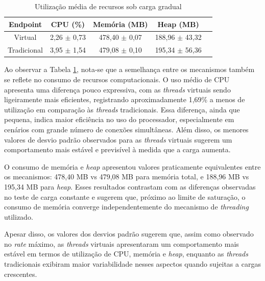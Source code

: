 \documentclass[12pt, openright, oneside, a4paper, english,	french,	spanish, brazil	]{abntex2}
\begin{document}
\begin{table}[H]
    \centering
    \caption{\footnotesize Utilização média de recursos sob carga gradual}
    \label{tab:recursos_ramp_up}
    \footnotesize
    \renewcommand{\arraystretch}{1.15}
    \setlength{\tabcolsep}{6pt}
    \begin{tabular}{ccccc}
        \toprule
        \textbf{Endpoint} &
        \textbf{CPU (\%)} &
        \textbf{Memória (MB)} &
        \textbf{Heap (MB)} \\
        \midrule
        Virtual          & 2,26 $\pm$ 0,73 & 478,40 $\pm$ 0,07 & 188,96 $\pm$ 43,32 \\
        Tradicional         & 3,95 $\pm$ 1,54 & 479,08 $\pm$ 0,10 & 195,34 $\pm$ 56,36\\
        \bottomrule
    \end{tabular}
\end{table}


Ao observar a Tabela \ref{tab:recursos_ramp_up}, nota-se que a semelhança entre os mecanismos também se reflete no consumo de recursos computacionais. O uso médio de CPU apresenta uma diferença pouco expressiva, com as \textit{threads} virtuais sendo ligeiramente mais eficientes, registrando aproximadamente 1,69\% a menos de utilização em comparação às \textit{threads} tradicionais.
Essa diferença, ainda que pequena, indica maior eficiência no uso do processador, especialmente em cenários com grande número de conexões simultâneas. Além disso, os menores valores de desvio padrão observados para as \textit{threads} virtuais sugerem um comportamento mais estável e previsível à medida que a carga aumenta.

O consumo de memória e \textit{heap} apresentou valores praticamente equivalentes entre os mecanismos: 478,40 MB vs 479,08 MB para memória total, e 188,96 MB vs 195,34 MB para \textit{heap}. Esses resultados contrastam com as diferenças observadas no teste de carga constante e sugerem que, próximo ao limite de saturação, o consumo de memória converge independentemente do mecanismo de \textit{threading} utilizado.


Apesar disso, os valores dos desvios padrão sugerem que, assim como observado no \textit{rate} máximo, as \textit{threads} virtuais apresentaram um comportamento mais estável em termos de utilização de CPU, memória e \textit{heap}, enquanto as \textit{threads} tradicionais exibiram maior variabilidade nesses aspectos quando sujeitas a cargas crescentes.
\end{document}
